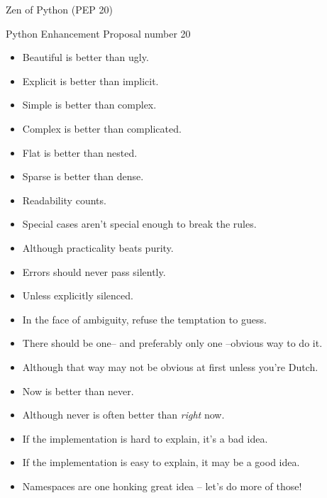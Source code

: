 \documentclass[ignorenonframetext,]{beamer}
\begin{document}
\begin{frame}{Zen of Python (PEP 20)}

    Python Enhancement Proposal number 20

    \begin{itemize}
        \item<1-1> Beautiful is better than ugly.
        \item<1-2> Explicit is better than implicit.
        \item<1-2> Simple is better than complex.
        \item<1-1> Complex is better than complicated.
        \item<1-1> Flat is better than nested.
        \item<1-1> Sparse is better than dense.
        \item<1-2> Readability counts.
        \item<1-1> Special cases aren't special enough to break the rules.
        \item<1-1> Although practicality beats purity.
        \item<1-1> Errors should never pass silently.
        \item<1-1> Unless explicitly silenced.
        \item<1-1> In the face of ambiguity, refuse the temptation to guess.
        \item<1-2> There should be one-- and preferably only one --obvious way to do it.
        \item<1-1> Although that way may not be obvious at first unless you're Dutch.
        \item<1-1> Now is better than never.
        \item<1-1> Although never is often better than \emph{right} now.
        \item<1-2> If the implementation is hard to explain, it's a bad idea.
        \item<1-1> If the implementation is easy to explain, it may be a good idea.
        \item<1-2> Namespaces are one honking great idea -- let's do more of those!
    \end{itemize}
\end{frame}
\end{document}
